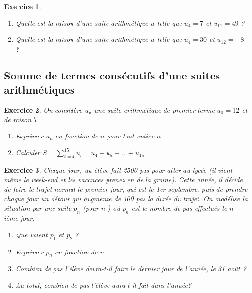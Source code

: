 \documentclass[10pt,a4paper]{article}
\newtheorem{exo}{Exercice}
\begin{document}
\begin{exo}
    \begin{enumerate}
        \item Quelle est la raison d'une suite arithmétique $u$ telle que $u_4=7$ et $u_{11}=49$ ?
        \item Quelle est la raison d'une suite arithmétique $u$ telle que $u_4=30$ et $u_{12}=-8$ ?
    \end{enumerate}
\end{exo}

\subsection{Somme de termes consécutifs d'une suites arithmétiques}

\begin{exo}
    On considère $u_n$ une suite arithmétique de premier terme $u_0=12$ et de raison $7$.
    \begin{enumerate}
        \item Exprimer $u_n$ en fonction de $n$ pour tout entier $n$
        \item Calculer $ S = \sum_{i=4}^{15} u_i = u_4 + u_5 + \ldots + u_{15}$
    \end{enumerate}
\end{exo}

\begin{exo}
    Chaque jour, un élève fait 2500 pas pour aller au lycée (il vient même le week-end et les vacances prenez en de la graine). Cette année, il décide de faire le trajet normal le premier jour, qui est le 1er septembre, puis de prendre chaque jour un détour qui augmente de 100 pas la durée du trajet. 
    On modélise la situation par une suite $p_n$ (pour $n$ ) où $p_n$ est le nombre de pas effectués le $n$-ième jour.
    \begin{enumerate}
        \item Que valent $p_1$ et $p_2$ ?
        \item Exprimer $p_n$ en fonction de $n$
        \item Combien de pas l'élève devra-t-il faire le  dernier jour de l'année, le 31 août ?
        \item Au total, combien de pas l'élève aura-t-il fait dans l'année?
    \end{enumerate}
\end{exo}
\end{document}
